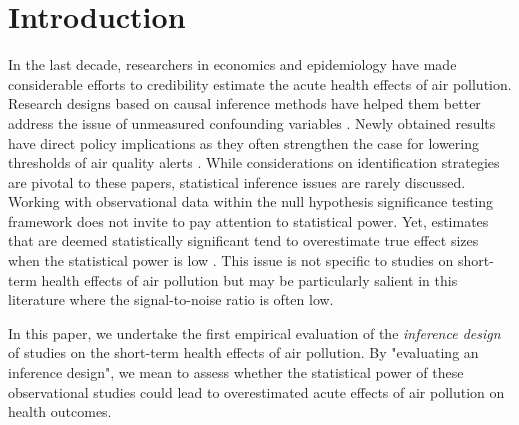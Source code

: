 \documentclass[12pt]{article}
\begin{document}





\section{Introduction}

    In the last decade, researchers in economics and epidemiology have made considerable efforts to credibility estimate the acute health effects of air pollution. Research designs based on causal inference methods have helped them better address the issue of unmeasured confounding variables \citep{dominici_best_2017, bind_causal_2019}. Newly obtained results have direct policy implications as they often strengthen the case for lowering thresholds of air quality alerts \citep{schwartz_estimating_2015, schwartz_national_2018, deryugina_mortality_2019}. While considerations on identification strategies are pivotal to these papers, statistical inference issues are rarely discussed. Working with observational data within the null hypothesis significance testing framework does not invite to pay attention to statistical power. Yet, estimates that are deemed statistically significant tend to overestimate true effect sizes when the statistical power is low \citep{ioannidis_why_2005, gelman_beyond_2014, ioannidis_power_2017, altoe_enhancing_2020, van_buuren_flexible_nodate}. This issue is not specific to studies on short-term health effects of air pollution but may be particularly salient in this literature where the signal-to-noise ratio is often low.
    
    
    In this paper, we undertake the first empirical evaluation of the \textit{inference design} of studies on the short-term health effects of air pollution. By "evaluating an inference design", we mean to assess whether the statistical power of these observational studies could lead to overestimated acute effects of air pollution on health outcomes.
    
\end{document}
